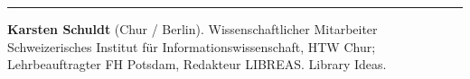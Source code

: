 \begin{center}\rule{0.5\linewidth}{\linethickness}\end{center}

\textbf{Karsten Schuldt} (Chur / Berlin). Wissenschaftlicher Mitarbeiter
Schweizerisches Institut für Informationswissenschaft, HTW Chur;
Lehrbeauftragter FH Potsdam, Redakteur LIBREAS. Library Ideas.
